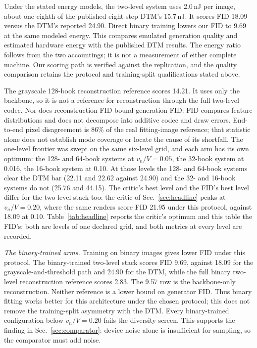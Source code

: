 \documentclass[reprint,amsmath,amssymb,aps,nofootinbib]{revtex4-2}
\begin{document}
Under the stated energy models, the two-level system uses 2.0\,nJ per
image, about one eighth of the published eight-step DTM's 15.7\,nJ. It
scores FID 18.09 versus the DTM's reported 24.90. Direct binary training lowers our FID to 9.69 at the
same modeled energy. This compares emulated generation quality and
estimated hardware energy with the published DTM results. The
energy ratio follows from the two accountings; it is not a
measurement of either complete machine. Our scoring path is verified
against the replication, and the quality comparison retains the
protocol and training-split qualifications stated above.

The grayscale 128-book reconstruction reference scores 14.21. It uses
only the backbone, so it is not a reference for reconstruction through
the full two-level codec. Nor does reconstruction FID bound generation
FID: FID compares feature distributions and does not decompose into
additive codec and draw errors. End-to-end pixel disagreement is 86\%
of the real fitting-image reference; that statistic alone does not
establish mode coverage or locate the cause of its shortfall.
The one-level frontier was swept
on the same six-level grid, and each arm has its own optimum: the
128- and 64-book systems at $v_n / V = 0.05$, the 32-book system at
0.016, the 16-book system at 0.10. At those levels the 128- and
64-book systems clear the DTM bar (22.11 and 22.62 against 24.90) and
the 32- and 16-book systems do not (25.76 and 44.15).
The critic's best level and the FID's best level differ for the
two-level stack too: the critic of Sec.~\ref{sec:headline} peaks at $v_n / V =
0.20$, where the same renders score FID 21.95 under this protocol,
against 18.09 at 0.10. Table~\ref{tab:headline} reports the critic's
optimum and this table the FID's; both are levels of one declared grid,
and both metrics at every level are recorded.

\emph{The binary-trained arms.} Training on binary images gives lower FID under this protocol. The binary-trained two-level
stack scores FID 9.69, against 18.09 for the grayscale-and-threshold
path and 24.90 for the DTM, while the full binary two-level reconstruction reference scores
2.83. The 9.57 row is the backbone-only reconstruction. Neither
reference is a lower bound on generator FID. Thus binary fitting works better for this architecture under the
chosen protocol; this does not remove the training-split asymmetry
with the DTM. Every binary-trained configuration below $v_n / V = 0.20$ fails the
diversity screen. This supports the finding in
Sec.~\ref{sec:comparator}: device noise alone is insufficient for
sampling, so the comparator must add noise.
\end{document}
